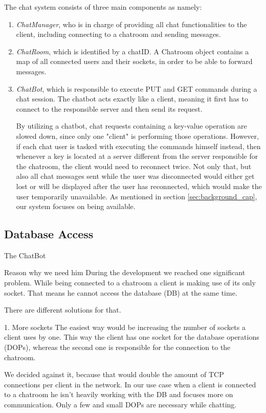 The chat system consists of three main components as namely:
\begin{enumerate}
	\item \textit{ChatManager}, who is in charge of providing all chat functionalities to the client, including connecting to a chatroom and sending messages.
	\item \textit{ChatRoom}, which is identified by a chatID. A Chatroom object contains a map of all connected users and their sockets, in order to be able to forward messages.
	\item \textit{ChatBot}, which is responsible to execute PUT and GET commands during a chat session. The chatbot acts exactly like a client, meaning it first has to connect to the responsible server and then send its request.
	
By utilizing a chatbot, chat requests containing a key-value operation are slowed down, since only one "client" is performing those operations. However, if each chat user is tasked with executing the commands himself instead, then whenever a key is located at a server different from the server responsible for the chatroom, the client would need to reconnect twice. Not only that, but also all chat messages sent while the user was disconnected would either get lost or will be displayed after the user has reconnected, which would make the user temporarily unavailable. As mentioned in section \ref{sec:background_cap}, our system focuses on being available. 	

\end{enumerate}

\subsection{Database Access}
\label{sec:groupchat_chatbot}
The ChatBot

Reason why we need him
During the development we reached one significant problem. While being connected to a chatroom a client is making use of its only socket. That means he cannot access the database (DB) at the same time.

There are different solutions for that.

1.	More sockets 
The easiest way would be increasing the number of sockets a client uses by one. This way the client has one socket for the database operations (DOPs), whereas the second one is responsible for the connection to the chatroom.

We decided against it, because that would double the amount of TCP connections per client in the network. In our use case when a client is connected to a chatroom he isn’t heavily working with the DB and focuses more on communication. Only a few and small DOPs are necessary while chatting.

